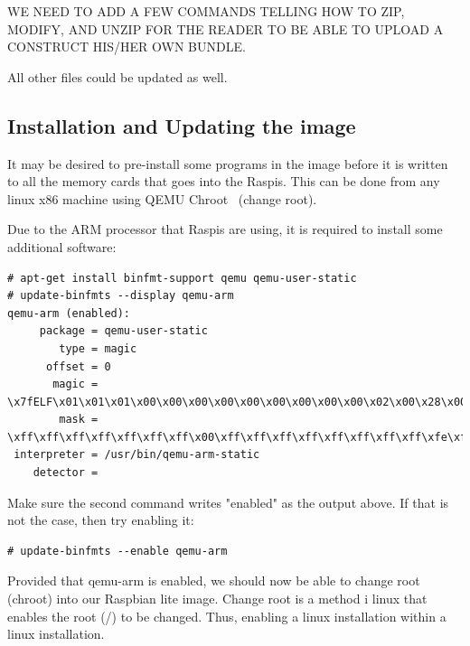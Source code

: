 WE NEED TO ADD A FEW COMMANDS TELLING HOW TO ZIP, MODIFY, AND UNZIP
FOR THE READER TO BE ABLE TO UPLOAD A CONSTRUCT HIS/HER OWN BUNDLE.

All other files could be updated as well.

\subsection{Installation and Updating the image}

It may be desired to pre-install some programs in the image before it is
written to all the memory cards that goes into the \ac{Raspi}s.
This can be done from any linux x86 machine using QEMU Chroot~\cite{QemuUserEmulation}
(change root).

Due to the \ac{ARM} processor that \ac{Raspi}s are using, it is required to
install some additional software:

\begin{lstlisting}[]
# apt-get install binfmt-support qemu qemu-user-static
# update-binfmts --display qemu-arm
qemu-arm (enabled):
     package = qemu-user-static
        type = magic
      offset = 0
       magic = \x7fELF\x01\x01\x01\x00\x00\x00\x00\x00\x00\x00\x00\x00\x02\x00\x28\x00
        mask = \xff\xff\xff\xff\xff\xff\xff\x00\xff\xff\xff\xff\xff\xff\xff\xff\xfe\xff\xff\xff
 interpreter = /usr/bin/qemu-arm-static
    detector = 
\end{lstlisting}
\FloatBarrier
\vspace{-5mm}

Make sure the second command writes "enabled" as the output above. If that 
is not the case, then try enabling it:

\begin{lstlisting}[]
# update-binfmts --enable qemu-arm
\end{lstlisting}
\FloatBarrier
\vspace{-5mm}

Provided that qemu-arm is enabled, we should now be able to change root (chroot)
into our Raspbian lite image. Change root is a method i linux that enables
the root (/) to be changed. Thus, enabling a linux installation within a
linux installation.

